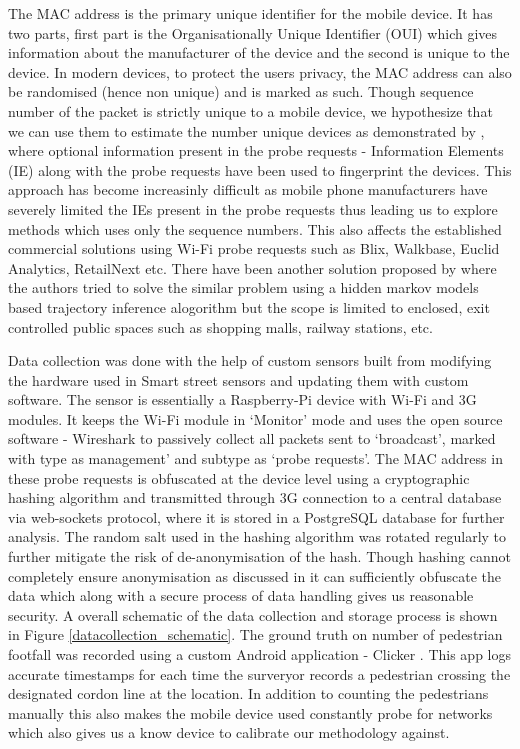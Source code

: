 The MAC address is the primary unique identifier for the mobile device. It has
two parts, first part is the Organisationally Unique Identifier (OUI) which
gives information about the manufacturer of the device and the second is unique
to the device. In modern devices, to protect the users privacy, the MAC address
can also be randomised (hence non unique) and is marked as such. Though
sequence number of the packet is strictly unique to a mobile device, we
hypothesize that we can use them to estimate the number unique devices as
demonstrated by \citep{vanhoef2016}, where optional information present in the
probe requests - Information Elements (IE) along with the probe requests have
been used to fingerprint the devices. This approach has become increasinly
difficult as mobile phone manufacturers have severely limited the IEs present
in the probe requests thus leading us to explore methods which uses only the
sequence numbers. This also affects the established commercial solutions using
Wi-Fi probe requests such as Blix, Walkbase, Euclid Analytics, RetailNext etc.
There have been another solution proposed by \citep{hong2018crowdprobe} where
the authors tried to solve the similar problem using a hidden markov models
based trajectory inference alogorithm but the scope is limited to enclosed,
exit controlled public spaces such as shopping malls, railway stations, etc.

Data collection was done with the help of custom sensors built from modifying
the hardware used in Smart street sensors \citep{sss2016} and updating them with
custom software. The sensor is essentially a Raspberry-Pi device with Wi-Fi and
3G modules. It keeps the Wi-Fi module in `Monitor' mode and uses the open source
software - Wireshark \citep{wireshark2} to passively collect all packets sent to
`broadcast', marked with type as management' and subtype as `probe requests'.
The MAC address in these probe requests is obfuscated at the device level using
a cryptographic hashing algorithm and transmitted through 3G connection to a
central database via web-sockets protocol, where it is stored in a PostgreSQL
database for further analysis. The random salt used in the hashing algorithm was
rotated regularly to further mitigate the risk of de-anonymisation of the hash.
Though hashing cannot completely ensure anonymisation as discussed in
\citep{demir2014analysing} it can sufficiently obfuscate the data which along
with a secure process of data handling gives us reasonable security. A overall
schematic of the data collection and storage process is shown in Figure
\ref{datacollection_schematic}. The ground truth on number of pedestrian
footfall was recorded using a custom Android application - Clicker
\citep{bala2018clicker}. This app logs accurate timestamps for each time the
surveryor records a pedestrian crossing the designated cordon line at the
location. In addition to counting the pedestrians manually this also makes the
mobile device used constantly probe for networks which also gives us a know
device to calibrate our methodology against.

